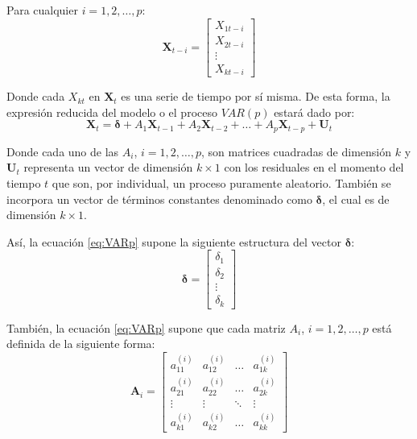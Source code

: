 \documentclass[
]{book}
\begin{document}
Para cualquier \(i = 1, 2, \ldots, p\): \begin{equation*}
    \mathbf{X}_{t-i} = 
    \begin{bmatrix}
    X_{1t-i} \\ X_{2t-i} \\ \vdots \\ X_{kt-i}
    \end{bmatrix}
\end{equation*}

Donde cada \(X_{kt}\) en \(\mathbf{X}_t\) es una serie de tiempo por sí
misma. De esta forma, la expresión reducida del modelo o el proceso
\(VAR(p)\) estará dado por:
\begin{equation}
    \mathbf{X}_t = \boldsymbol{\delta} + A_1 \mathbf{X}_{t-1} + A_2 \mathbf{X}_{t-2} + \ldots + A_p \mathbf{X}_{t-p} + \mathbf{U}_{t}
    \label{eq:VARp}
\end{equation}

Donde cada uno de las \(A_i\), \(i = 1, 2, \ldots, p\), son matrices
cuadradas de dimensión \(k\) y \(\mathbf{U}_t\) representa un vector de
dimensión \(k \times 1\) con los residuales en el momento del tiempo \(t\)
que son, por individual, un proceso puramente aleatorio. También se
incorpora un vector de términos constantes denominado como
\(\mathbf{\delta}\), el cual es de dimensión \(k \times 1\).

Así, la ecuación \eqref{eq:VARp} supone la siguiente estructura del
vector \(\boldsymbol{\delta}\): \begin{equation*}
    \boldsymbol{\delta} = 
    \begin{bmatrix}
    \delta_{1} \\ \delta_{2} \\ \vdots \\ \delta_{k}
    \end{bmatrix}
\end{equation*}

También, la ecuación \eqref{eq:VARp} supone que cada matriz \(A_i\),
\(i = 1, 2, \ldots, p\) está definida de la siguiente forma:
\begin{equation*}
    \mathbf{A}_i = 
    \begin{bmatrix}
    a^{(i)}_{11} & a^{(i)}_{12} & \ldots & a^{(i)}_{1k} \\ a^{(i)}_{21} & a^{(i)}_{22} & \ldots & a^{(i)}_{2k} \\ \vdots & \vdots & \ddots & \vdots \\ a^{(i)}_{k1} & a^{(i)}_{k2} & \ldots & a^{(i)}_{kk}
    \end{bmatrix}
\end{equation*}
\end{document}
